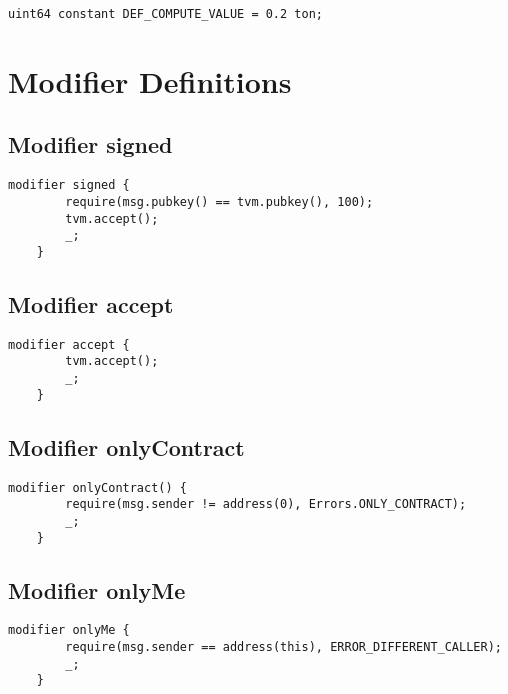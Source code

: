 \begin{lstlisting}[firstnumber=30]
    uint64 constant DEF_COMPUTE_VALUE = 0.2 ton;
\end{lstlisting}

\section{Modifier Definitions}


\subsection{Modifier signed}


\begin{lstlisting}[firstnumber=32]
    modifier signed {
        require(msg.pubkey() == tvm.pubkey(), 100);
        tvm.accept();
        _;
    }
\end{lstlisting}

\subsection{Modifier accept}


\begin{lstlisting}[firstnumber=38]
    modifier accept {
        tvm.accept();
        _;
    }
\end{lstlisting}

\subsection{Modifier onlyContract}


\begin{lstlisting}[firstnumber=43]
    modifier onlyContract() {
        require(msg.sender != address(0), Errors.ONLY_CONTRACT);
        _;
    }
\end{lstlisting}

\subsection{Modifier onlyMe}


\begin{lstlisting}[firstnumber=48]
    modifier onlyMe {
        require(msg.sender == address(this), ERROR_DIFFERENT_CALLER);
        _;
    }
\end{lstlisting}
